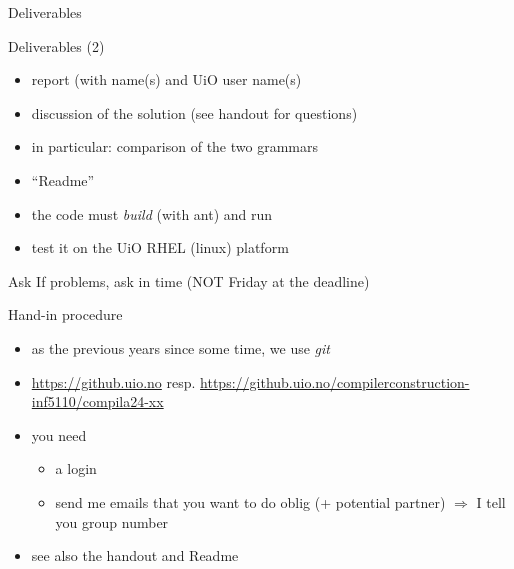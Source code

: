 \documentclass{beamer}
\begin{document}
\begin{frame}[label={sec:orgf844996}]{Deliverables}
\begin{block}{Deliverables (2)}
\begin{itemize}
\item report (with name(s) and UiO user name(s)
\item discussion of the solution (see handout for questions)
\item in particular: comparison of the two grammars
\item ``Readme''
\end{itemize}
\end{block}
\begin{itemize}
\item the code must \emph{build} (with ant) and run
\item test it on the  UiO RHEL (linux) platform
\end{itemize}
\begin{block}{Ask}
If problems, \alert{ask in time}  (\alert{NOT} Friday at the deadline)
\end{block}
\end{frame}
\begin{frame}[label={sec:org2c7cc1d}]{Hand-in procedure}
\begin{itemize}
\item as the previous years since some time, we use  \emph{git}

\item \url{https://github.uio.no} resp.
\href{https://github.uio.no/compilerconstruction-inf5110/compila}{https://github.uio.no/compilerconstruction-inf5110/compila24-xx}

\item you need

\begin{itemize}
\item a login
\item send me emails that you want to do oblig (+ potential partner)
\(\Rightarrow\) I tell you group number
\end{itemize}
\end{itemize}


\begin{itemize}
\item see also the \alert{handout} and \alert{Readme}
\end{itemize}
\end{frame}



\end{document}
